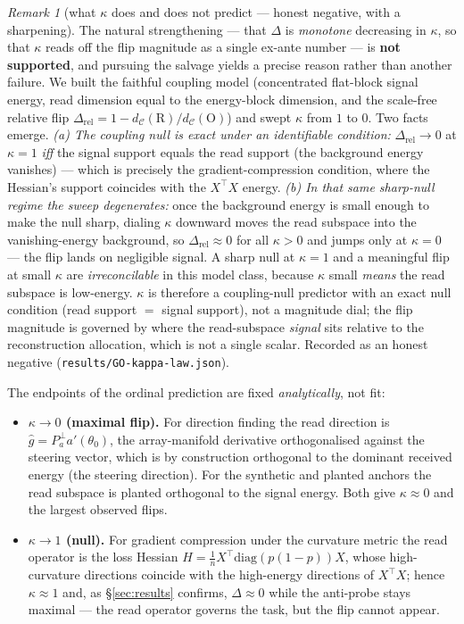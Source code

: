 \documentclass[11pt]{article}
\theoremstyle{remark}
\newtheorem*{remark}{Remark}
\newcommand{\kalign}{\kappa}
\begin{document}
\begin{remark}[what $\kalign$ does and does not predict --- honest negative, with a sharpening]\label{rem:kappa}
The natural strengthening --- that $\Delta$ is \emph{monotone} decreasing in $\kalign$, so
that $\kalign$ reads off the flip magnitude as a single ex-ante number --- is \textbf{not
supported}, and pursuing the salvage yields a precise reason rather than another failure.
We built the faithful coupling model (concentrated flat-block signal energy, read
dimension equal to the energy-block dimension, and the scale-free relative flip
$\Delta_{\mathrm{rel}}=1-d_{\mathcal C}(\mathrm R)/d_{\mathcal C}(\mathrm O)$) and swept
$\kalign$ from $1$ to $0$. Two facts emerge. \emph{(a) The coupling null is exact under an
identifiable condition:} $\Delta_{\mathrm{rel}}\to0$ at $\kalign=1$ \emph{iff} the signal
support equals the read support (the background energy vanishes) --- which is precisely the
gradient-compression condition, where the Hessian's support coincides with the $X^\top X$
energy. \emph{(b) In that same sharp-null regime the sweep degenerates:} once the
background energy is small enough to make the null sharp, dialing $\kalign$ downward moves
the read subspace into the vanishing-energy background, so $\Delta_{\mathrm{rel}}\approx0$
for all $\kalign>0$ and jumps only at $\kalign=0$ --- the flip lands on negligible signal.
A sharp null at $\kalign=1$ and a meaningful flip at small $\kalign$ are
\emph{irreconcilable} in this model class, because $\kalign$ small \emph{means} the read
subspace is low-energy. $\kalign$ is therefore a coupling-null predictor with an exact null
condition (read support $=$ signal support), not a magnitude dial; the flip magnitude is
governed by where the read-subspace \emph{signal} sits relative to the reconstruction
allocation, which is not a single scalar. Recorded as an honest negative
(\texttt{results/GO-kappa-law.json}).
\end{remark}

\noindent The endpoints of the ordinal prediction are fixed \emph{analytically}, not fit:
\begin{itemize}\itemsep2pt
\item \textbf{$\kalign\to0$ (maximal flip).} For direction finding the read direction is
$\hat g = P_a^{\perp}a'(\theta_0)$, the array-manifold derivative orthogonalised against
the steering vector, which is by construction orthogonal to the dominant received energy
(the steering direction). For the synthetic and planted anchors the read subspace is
planted orthogonal to the signal energy. Both give $\kalign\approx0$ and the largest
observed flips.
\item \textbf{$\kalign\to1$ (null).} For gradient compression under the curvature metric
the read operator is the loss Hessian $H=\tfrac1n X^\top \mathrm{diag}(p(1{-}p))X$, whose
high-curvature directions coincide with the high-energy directions of $X^\top X$; hence
$\kalign\approx1$ and, as \S\ref{sec:results} confirms, $\Delta\approx0$ while the
anti-probe stays maximal --- the read operator governs the task, but the flip cannot
appear.
\end{itemize}
\end{document}
